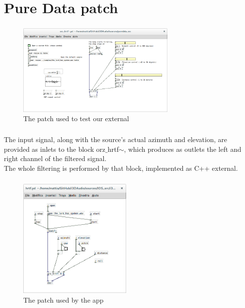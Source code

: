 \documentclass{beamer}
\begin{document}
	\section{Pure Data patch}

	\begin{frame}
		\frametitle{\insertsection}
		\begin{figure}
			\centering
			  \includegraphics[width=0.7\textwidth]{images/Test_patch.png}
			  \caption{The patch used to test our external}
			  \label{fig:test}
		\end{figure}
	\end{frame}
	
	\begin{frame}
		\frametitle{\insertsection}
		The input signal, along with the source's actual azimuth and elevation, are provided
		as inlets to the block orz$\_$hrtf$\sim$, which produces as outlets the
		left and right channel of the filtered signal.\\
		The whole filtering is performed by that block, implemented as C++ external.\\
	\end{frame}

	\begin{frame}
		\frametitle{\insertsection}
		\begin{figure}
			\centering
			  \includegraphics[width=0.5\textwidth]{images/iOS_patch.png}
			  \caption{The patch used by the app}
			  \label{fig:ios_pd}
		\end{figure}
	\end{frame}
\end{document}
